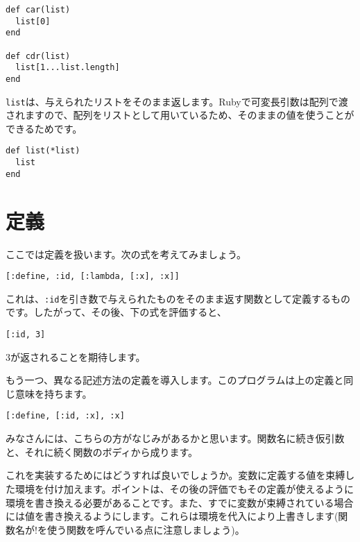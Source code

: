 \begin{lstlisting}
def car(list)
  list[0]
end

def cdr(list)
  list[1...list.length]
end
\end{lstlisting}

{\tt list}は、与えられたリストをそのまま返します。Rubyで可変長引数は配列で渡されますので、配列をリストとして用いているため、そのままの値を使うことができるためです。

\begin{lstlisting}
def list(*list)
  list
end
\end{lstlisting}


\section{定義}

ここでは定義を扱います。次の式を考えてみましょう。
\begin{lstlisting}
[:define, :id, [:lambda, [:x], :x]]
\end{lstlisting}

これは、{\tt :id}を引き数で与えられたものをそのまま返す関数として定義するものです。したがって、その後、下の式を評価すると、
\begin{lstlisting}
[:id, 3]
\end{lstlisting}
3が返されることを期待します。

もう一つ、異なる記述方法の定義を導入します。このプログラムは上の定義と同じ意味を持ちます。
\begin{lstlisting}
[:define, [:id, :x], :x]
\end{lstlisting}

みなさんには、こちらの方がなじみがあるかと思います。関数名に続き仮引数と、それに続く関数のボディから成ります。

これを実装するためにはどうすれば良いでしょうか。変数に定義する値を束縛した環境を付け加えます。ポイントは、その後の評価でもその定義が使えるように環境を書き換える必要があることです。また、すでに変数が束縛されている場合には値を書き換えるようにします。これらは環境を代入により上書きします(関数名が!を使う関数を呼んでいる点に注意しましょう)。


